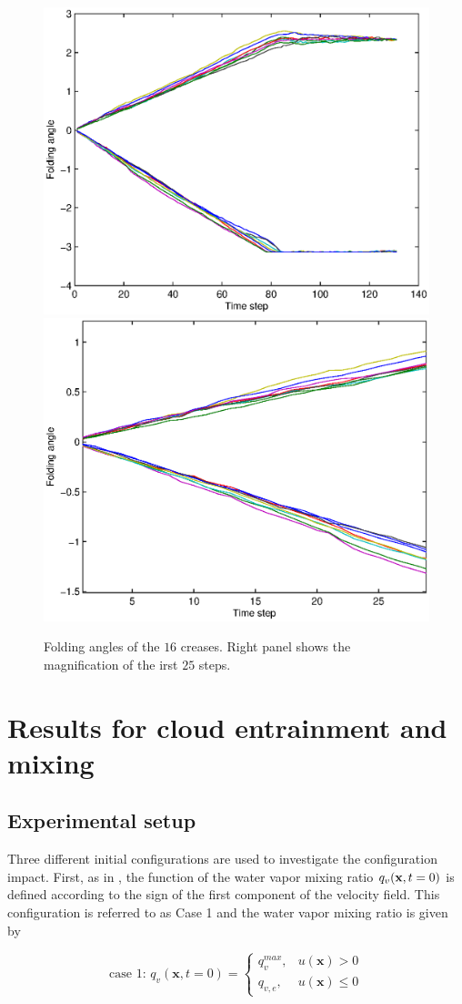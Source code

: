 \begin{figure}[!htbp]\centering
\includegraphics[width=0.45\columnwidth]{Figures/folding-angle}
\includegraphics[width=0.45\columnwidth]{Figures/folding-angle-zoom}
\caption{Folding angles of the $16$ creases. Right panel shows the magnification of the irst $25$ steps.}
\label{fig:folding_angles}
\end{figure}

\section{Results for cloud entrainment and mixing}
\subsection{Experimental setup}
Three different initial configurations are used to investigate
the configuration impact. First, as in \cite{Andrejczuk2004}, the function of the water vapor mixing 
ratio $q_v(\mathbf{x}, t = 0)$ is defined according to the sign of the first component of the velocity 
field. This configuration is referred to as Case 1 and the water vapor mixing ratio is
given by

\begin{equation}
\mbox{case 1: } q_v(\mathbf{x},t=0) = 
\left\{\begin{array}{lr}
q_v^{max}, & u(\mathbf{x}) > 0\\
q_{v,e}, & u(\mathbf{x}) \le 0
\end{array}\right.\label{case1}
\end{equation}

